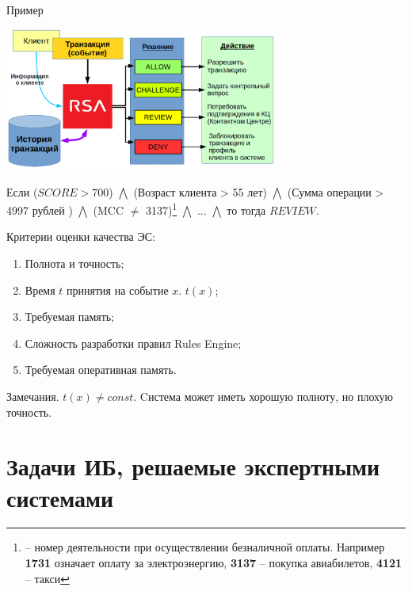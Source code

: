 \begin{frame}{Пример}
    
    \includegraphics[width=9cm]{../pic/expert_system_rsa.png}
	
	\small
	Если 
	($SCORE > 700$) $\bigwedge$
	(Возраст клиента > 55 лет) $\bigwedge$
	(Сумма операции > 4997 рублей ) $\bigwedge$
	(MCC $\neq$ 3137)\footnote{ -- номер деятельности при осуществлении безналичной оплаты. Например \textbf{1731} означает оплату за электроэнергию, \textbf{3137} -- покупка авиабилетов, \textbf{4121} -- такси} $\bigwedge$
	... $\bigwedge$
	то тогда  $REVIEW$.
	
\end{frame}






\begin{frame}
	Критерии оценки качества ЭС:
	\begin{enumerate}
		\item Полнота и точность;
		\item Время $t$ принятия на событие $x$. $t(x)$;
		\item Требуемая память;
		\item Сложность разработки правил Rules Engine;
		\item Требуемая оперативная память.
	\end{enumerate}
	
	\begin{block}{Замечания.}
		$t(x) \neq const$. Cистема может иметь хорошую полноту, но плохую точность.
	\end{block}
\end{frame}

  \section{Задачи ИБ, решаемые экспертными системами}\label{section:is_tasks}
	
